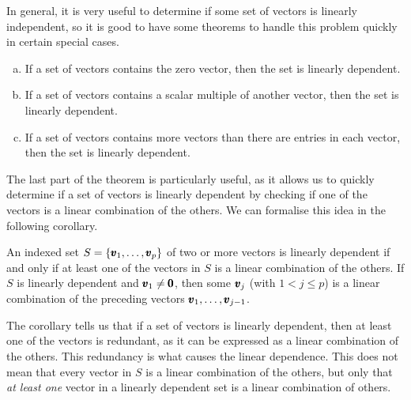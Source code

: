In general, it is very useful to determine if some set of vectors is linearly independent, so it is good to have
some theorems to handle this problem quickly in certain special cases.

\begin{theorem}
    \begin{enumerate}[(a)]
        \item If a set of vectors contains the zero vector, then the set is linearly dependent.
        \item If a set of vectors contains a scalar multiple of another vector, then the set is linearly dependent.
        \item If a set of vectors contains more vectors than there are entries in each vector, then the set is linearly dependent.
    \end{enumerate}
\end{theorem}

The last part of the theorem is particularly useful, as it allows us to quickly determine if a set of vectors is linearly dependent by checking if one of the vectors is a linear combination of the others. We can formalise this idea in the following corollary.

\begin{corollary}
    An indexed set $S = \left\{\pmb{v}_1, \ldots, \pmb{v}_p\right\}$ of two or more vectors is linearly dependent if and only if at least one of the vectors in $S$ is a linear combination of the others. If $S$ is linearly dependent and $\pmb{v}_1 \neq \pmb{0}$, then some $\pmb{v}_j$ (with $1 < j \leq p$) is a linear combination of the preceding vectors $\pmb{v}_1, \ldots, \pmb{v}_{j-1}$.
\end{corollary}

\begin{remark}
    The corollary tells us that if a set of vectors is linearly dependent, then at least one of the vectors is redundant, as it can be expressed as a linear combination of the others. This redundancy is what causes the linear dependence. This does not mean that every vector in $S$ is a linear combination of the others, but only that \textit{at least one} vector in a linearly dependent set is a linear combination of others.
\end{remark}

